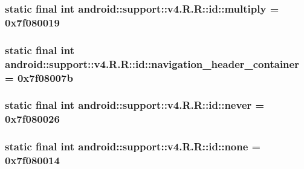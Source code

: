 \hypertarget{classandroid_1_1support_1_1v4_1_1_r_1_1id_acad4246cbc0ae8ab4c5e5d50098396f}{
\subsubsection[{multiply}]{\setlength{\rightskip}{0pt plus 5cm}static final int android::support::v4.R.R::id::multiply = 0x7f080019}}
\label{classandroid_1_1support_1_1v4_1_1_r_1_1id_acad4246cbc0ae8ab4c5e5d50098396f}


\hypertarget{classandroid_1_1support_1_1v4_1_1_r_1_1id_c108538ddf8daee65c9e82687e803244}{
\subsubsection[{navigation\_\-header\_\-container}]{\setlength{\rightskip}{0pt plus 5cm}static final int android::support::v4.R.R::id::navigation\_\-header\_\-container = 0x7f08007b}}
\label{classandroid_1_1support_1_1v4_1_1_r_1_1id_c108538ddf8daee65c9e82687e803244}


\hypertarget{classandroid_1_1support_1_1v4_1_1_r_1_1id_af332485d41e093a6e470665940f5036}{
\subsubsection[{never}]{\setlength{\rightskip}{0pt plus 5cm}static final int android::support::v4.R.R::id::never = 0x7f080026}}
\label{classandroid_1_1support_1_1v4_1_1_r_1_1id_af332485d41e093a6e470665940f5036}


\hypertarget{classandroid_1_1support_1_1v4_1_1_r_1_1id_ba9e0a230be649d9c7a4f5acc6969377}{
\subsubsection[{none}]{\setlength{\rightskip}{0pt plus 5cm}static final int android::support::v4.R.R::id::none = 0x7f080014}}
\label{classandroid_1_1support_1_1v4_1_1_r_1_1id_ba9e0a230be649d9c7a4f5acc6969377}


